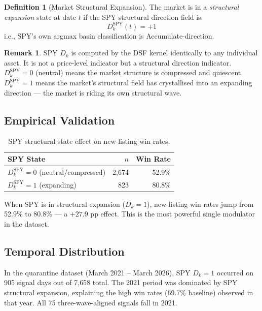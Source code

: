 \documentclass[11pt, a4paper]{article}
\newcommand{\Dk}{D_k}
\theoremstyle{definition}
\newtheorem{definition}{Definition}
\newtheorem{remark}{Remark}
\begin{document}
\begin{definition}[Market Structural Expansion]
The market is in a \emph{structural expansion} state at date $t$ if the
SPY structural direction field is:
\[
  D_{k}^{\mathrm{SPY}}(t) = +1
\]
i.e., SPY's own argmax basin classification is Accumulate-direction.
\end{definition}

\begin{remark}
SPY $\Dk$ is computed by the DSF kernel identically to any individual asset.
It is not a price-level indicator but a structural direction indicator.
$D_{k}^{\mathrm{SPY}} = 0$ (neutral) means the market structure is compressed
and quiescent.
$D_{k}^{\mathrm{SPY}} = 1$ means the market's structural field has crystallised
into an expanding direction — the market is riding its own structural wave.
\end{remark}

\subsection{Empirical Validation}

\begin{table}[h!]
\centering
\caption{SPY structural state effect on new-listing win rates.}
\begin{tabular}{lrr}
\toprule
\textbf{SPY State} & \textbf{$n$} & \textbf{Win Rate} \\
\midrule
$D_k^{\mathrm{SPY}} = 0$ (neutral/compressed) & 2{,}674 & 52.9\% \\
$D_k^{\mathrm{SPY}} = 1$ (expanding)           & 823     & 80.8\% \\
\bottomrule
\end{tabular}
\end{table}

When SPY is in structural expansion ($\Dk = 1$), new-listing win rates
jump from 52.9\% to 80.8\% — a $+27.9$ pp effect.
This is the most powerful single modulator in the dataset.

\subsection{Temporal Distribution}

In the quarantine dataset (March 2021 -- March 2026), SPY $\Dk = 1$ occurred on
905 signal days out of 7{,}658 total.
The 2021 period was dominated by SPY structural expansion, explaining the
high win rates (69.7\% baseline) observed in that year.
All 75 three-wave-aligned signals fall in 2021.
\end{document}
